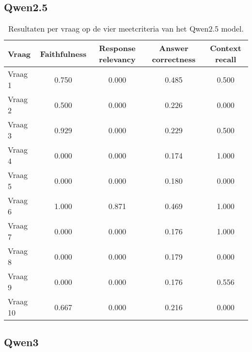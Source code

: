 \subsection{Qwen2.5}

\begin{table}[H]
    \centering
    \begin{tabular}{|l|c|c|c|c|}
        \hline
        \textbf{Vraag} & \textbf{Faithfulness} & \textbf{Response relevancy} & \textbf{Answer correctness} & \textbf{Context recall} \\
        \hline
        Vraag 1  & 0.750 & 0.000 & 0.485 & 0.500 \\
        Vraag 2  & 0.500 & 0.000 & 0.226 & 0.000 \\
        Vraag 3  & 0.929 & 0.000 & 0.229 & 0.500 \\
        Vraag 4  & 0.000 & 0.000 & 0.174 & 1.000 \\
        Vraag 5  & 0.000 & 0.000 & 0.180 & 0.000 \\
        Vraag 6  & 1.000 & 0.871 & 0.469 & 1.000 \\
        Vraag 7  & 0.000 & 0.000 & 0.176 & 1.000 \\
        Vraag 8  & 0.000 & 0.000 & 0.179 & 0.000 \\
        Vraag 9  & 0.000 & 0.000 & 0.176 & 0.556 \\
        Vraag 10 & 0.667 & 0.000 & 0.216 & 0.000 \\
        \hline
    \end{tabular}
    \caption{Resultaten per vraag op de vier meetcriteria van het Qwen2.5 model.}
    \label{tab:resultaten_vragen_qwen2.5}
\end{table}


\subsection{Qwen3}

